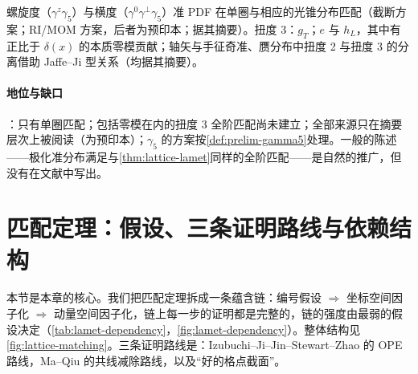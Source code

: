 \begin{proposition}\label{prop:lamet-polarized}
螺旋度（$\gamma^z\gamma_5$）与横度（$\gamma^0\gamma^\perp\gamma_5$）准 PDF 在单圈与相应的光锥分布匹配（截断方案\cite{XiongEtAl2014}；RI/MOM 方案\cite{Lin:2018pvv,Liu:2018hxv}，后者为预印本；据其摘要）。扭度 3：$g_T$\cite{Bhattacharya:2020xlt}；$e$ 与 $h_L$，其中有正比于 $\delta(x)$ 的本质零模贡献\cite{Bhattacharya:2020jfj}；轴矢\cite{Braun:2021aon}与手征奇\cite{Braun:2021gvv}准、赝分布中扭度 2 与扭度 3 的分离借助 Jaffe--Ji 型关系（均据其摘要）。
\end{proposition}

\paragraph{地位与缺口}
\tagP：只有单圈匹配；包括零模在内的扭度 3 全阶匹配尚未建立；全部来源只在摘要层次上被阅读（\cite{Liu:2018hxv}为预印本）；$\gamma_5$ 的方案按\cref{def:prelim-gamma5}处理。一般的陈述——极化准分布满足与\cref{thm:lattice-lamet}同样的全阶匹配——是自然的推广，但没有在文献中写出。

\section{匹配定理：假设、三条证明路线与依赖结构}\label{sec:lattice-matching}

本节是本章的核心。我们把匹配定理拆成一条蕴含链：编号假设 $\Rightarrow$ 坐标空间因子化 $\Rightarrow$ 动量空间因子化，链上每一步的证明都是完整的，链的强度由最弱的假设决定（\cref{tab:lamet-dependency}，\cref{fig:lamet-dependency}）。整体结构见\cref{fig:lattice-matching}。三条证明路线是：Izubuchi--Ji--Jin--Stewart--Zhao 的 OPE 路线\cite{IzubuchiEtAl2018}，Ma--Qiu 的共线减除路线\cite{Ma:2014jla}，以及“好的格点截面”\cite{MaQiu2018}。

